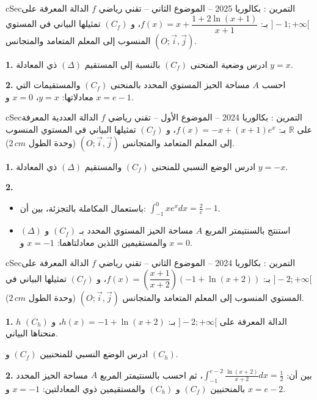 \documentclass[12pt,a4paper]{article}
\newenvironment{BOX}[2]{\begin{otherlanguage}{english}\begin{arbox}{#1}{#2}}{\end{arbox}\end{otherlanguage}}
\newcounter{exo}
\newenvironment{tamrin}[1]{\stepcounter{exo}\begin{BOX}{cSec}{التمرين \theexo: #1}}{\end{BOX}}
\newcommand{\R}{\mathbb{R}}
\newenvironment{sq}{\begin{itemize}[leftmargin=2.4em,itemsep=3pt]}{\end{itemize}}
\newcommand{\qa}{\item[(أ)]}\newcommand{\qb}{\item[(ب)]}\newcommand{\qc}{\item[(جـ)]}\newcommand{\qd}{\item[(د)]}\newcommand{\qe}{\item[(هـ)]}
\newcommand{\QQ}[1]{\par\smallskip\textbf{#1.} }
\begin{document}
\begin{tamrin}{بكالوريا 2025 -- الموضوع الثاني -- تقني رياضي}
$f$ الدالة المعرفة على $]-1;+\infty[$ بـ: $f(x)=x+\dfrac{1+2\ln(x+1)}{x+1}$، و $(C_f)$ تمثيلها البياني في المستوي المنسوب إلى المعلم المتعامد والمتجانس $(O;\vec{i},\vec{j})$.

\QQ{1} ادرس وضعية المنحنى $(C_f)$ بالنسبة إلى المستقيم $(\Delta)$ ذي المعادلة $y=x$.

\QQ{2} احسب $A$ مساحة الحيز المستوي المحدد بالمنحنى $(C_f)$ والمستقيمات التي معادلاتها: $y=x$، $x=0$ و $x=e-1$.
\end{tamrin}

\begin{tamrin}{بكالوريا 2024 -- الموضوع الأول -- تقني رياضي}
$f$ الدالة العددية المعرفة على $\R$ بـ: $f(x)=-x+(x+1)e^{x}$، و $(C_f)$ تمثيلها البياني في المستوي المنسوب إلى المعلم المتعامد والمتجانس $(O;\vec{i},\vec{j})$ (وحدة الطول $2\,cm$).

\QQ{1} ادرس الوضع النسبي للمنحنى $(C_f)$ والمستقيم $(\Delta)$ ذي المعادلة $y=-x$.

\QQ{2}
\begin{sq}
\qa باستعمال المكاملة بالتجزئة، بين أن: $\displaystyle\int_{-1}^{0}xe^{x}dx=\frac{2}{e}-1$.
\qb استنتج بالسنتيمتر المربع $A$ مساحة الحيز المستوي المحدد بـ $(C_f)$ و $(\Delta)$ والمستقيمين اللذين معادلتاهما: $x=-1$ و $x=0$.
\end{sq}
\end{tamrin}

\begin{tamrin}{بكالوريا 2024 -- الموضوع الثاني -- تقني رياضي}
$f$ الدالة المعرفة على $]-2;+\infty[$ بـ: $f(x)=\left(\dfrac{x+1}{x+2}\right)\left(-1+\ln(x+2)\right)$، و $(C_f)$ تمثيلها البياني في المستوي المنسوب إلى المعلم المتعامد والمتجانس $(O;\vec{i},\vec{j})$ (وحدة الطول $2\,cm$).

\QQ{1} $h$ الدالة المعرفة على $]-2;+\infty[$ بـ: $h(x)=-1+\ln(x+2)$، و $(C_h)$ منحناها البياني.

ادرس الوضع النسبي للمنحنيين $(C_f)$ و $(C_h)$.

\QQ{2} بين أن: $\displaystyle\int_{-1}^{e-2}\frac{\ln(x+2)}{x+2}dx=\frac12$، ثم احسب بالسنتيمتر المربع $A$ مساحة الحيز المحدد بالمنحنيين $(C_f)$ و $(C_h)$ والمستقيمين ذوي المعادلتين: $x=-1$ و $x=e-2$.
\end{tamrin}
\end{document}
